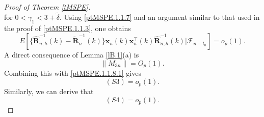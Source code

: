 \documentclass[ejsv2]{imsart}
\theoremstyle{plain}
\theoremstyle{definition}
\theoremstyle{remark}
\begin{document}
\begin{proof}[Proof of Theorem \ref{tMSPE}]
{\begin{equation}
\end{equation}
for $0<\gamma_1<3+\tilde{\delta}$. Using \eqref{ptMSPE.1.1.7} and an argument similar to that used in the proof of \eqref{ptMSPE.1.1.3}, one obtains
\begin{equation}\label{ptMSPE.1.1.8.1}
E[\{\hat{\mathbf{R}}_{n,h}^{-1}(k)-\tilde{\mathbf{R}}_n^{-1}(k)\}\mathbf{x}_n(k)\mathbf{x}^\top_n(k)
     \hat{\mathbf{R}}_{n,h}^{-1}(k)|\mathcal{F}_{n-l_n}]=o_p(1).
\end{equation}
A direct consequence of Lemma \ref{lB.1}(a) is
\begin{equation}\label{M 3n}
\lVert M_{3n}\rVert=O_p(1).
\end{equation}
Combining this with \eqref{ptMSPE.1.1.8.1} gives
\begin{equation}\label{ptMSPE.1.1.8}
(S3)=o_p(1).
\end{equation}
Similarly, we can derive that
\begin{equation}\label{ptMSPE.1.1.9}
(S4)=o_p(1).
\end{equation}

}
\end{proof}
\end{document}
